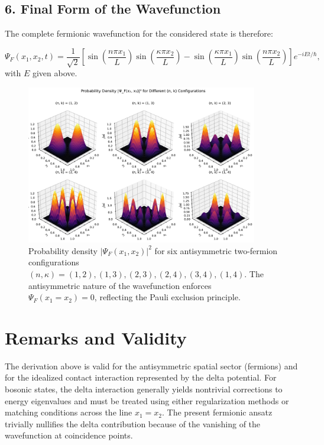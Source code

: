 \subsection*{6. Final Form of the Wavefunction}

The complete fermionic wavefunction for the considered state is therefore:


\begin{equation}
    \Psi_F(x_1, x_2, t) = \frac{1}{\sqrt{2}}
    \left[
    \sin\left(\frac{n\pi x_1}{L}\right)\sin\left(\frac{\kappa\pi x_2}{L}\right)
    - \sin\left(\frac{\kappa\pi x_1}{L}\right)\sin\left(\frac{n\pi x_2}{L}\right)
    \right]
    e^{-iEt/\hbar},
\end{equation}
with $E$ given above.

\begin{figure}[h!]
    \centering
    \includegraphics[width=0.9\textwidth]{ figures/fermions_3D_collage-1.pdf}
    \caption{Probability density $|\Psi_F(x_1, x_2)|^2$ for six antisymmetric two-fermion configurations
    $(n,\kappa) = (1,2), (1,3), (2,3), (2,4), (3,4), (1,4)$.
    The antisymmetric nature of the wavefunction enforces $\Psi_F(x_1 = x_2) = 0$, reflecting the Pauli exclusion principle.}
    \label{fig:fermion_3D_collage}
\end{figure}


\section{Remarks and Validity}

The derivation above is valid for the antisymmetric spatial sector (fermions) and for the idealized contact interaction represented by the delta potential. For bosonic states, the delta interaction generally yields nontrivial corrections to energy eigenvalues and must be treated using either regularization methods or matching conditions across the line $x_1=x_2$. The present fermionic ansatz trivially nullifies the delta contribution because of the vanishing of the wavefunction at coincidence points.
